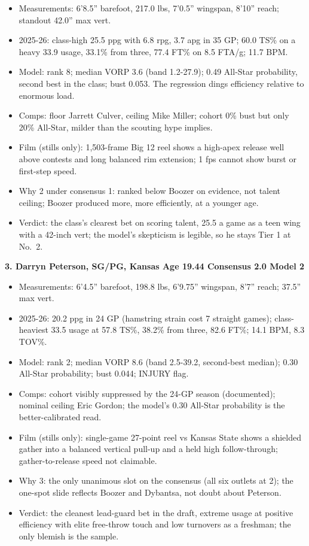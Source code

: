 \documentclass[
  10pt,
]{article}
\providecommand{\tightlist}{%
  \setlength{\itemsep}{0pt}\setlength{\parskip}{0pt}}
\begin{document}
\begin{itemize}
\tightlist
\item
  Measurements: 6'8.5'' barefoot, 217.0 lbs, 7'0.5'' wingspan, 8'10'' reach;
  standout 42.0'' max vert.
\item
  2025-26: class-high 25.5 ppg with 6.8 rpg, 3.7 apg in 35 GP; 60.0 TS\% on a
  heavy 33.9 usage, 33.1\% from three, 77.4 FT\% on 8.5 FTA/g; 11.7 BPM.
\item
  Model: rank 8; median VORP 3.6 (band 1.2-27.9); 0.49 All-Star probability,
  second best in the class; bust 0.053. The regression dings efficiency relative
  to enormous load.
\item
  Comps: floor Jarrett Culver, ceiling Mike Miller; cohort 0\% bust but only
  20\% All-Star, milder than the scouting hype implies.
\item
  Film (stills only): 1,503-frame Big 12 reel shows a high-apex release well
  above contests and long balanced rim extension; 1 fps cannot show burst or
  first-step speed.
\item
  Why 2 under consensus 1: ranked below Boozer on evidence, not talent ceiling;
  Boozer produced more, more efficiently, at a younger age.
\item
  Verdict: the class's clearest bet on scoring talent, 25.5 a game as a teen
  wing with a 42-inch vert; the model's skepticism is legible, so he stays Tier
  1 at No.~2.
\end{itemize}

\textbf{3. Darryn Peterson, SG/PG, Kansas \textbar{} Age 19.44 \textbar{}
Consensus 2.0 \textbar{} Model 2}

\begin{itemize}
\tightlist
\item
  Measurements: 6'4.5'' barefoot, 198.8 lbs, 6'9.75'' wingspan, 8'7'' reach;
  37.5'' max vert.
\item
  2025-26: 20.2 ppg in 24 GP (hamstring strain cost 7 straight games);
  class-heaviest 33.5 usage at 57.8 TS\%, 38.2\% from three, 82.6 FT\%; 14.1
  BPM, 8.3 TOV\%.
\item
  Model: rank 2; median VORP 8.6 (band 2.5-39.2, second-best median); 0.30
  All-Star probability; bust 0.044; INJURY flag.
\item
  Comps: cohort visibly suppressed by the 24-GP season (documented); nominal
  ceiling Eric Gordon; the model's 0.30 All-Star probability is the
  better-calibrated read.
\item
  Film (stills only): single-game 27-point reel vs Kansas State shows a shielded
  gather into a balanced vertical pull-up and a held high follow-through;
  gather-to-release speed not claimable.
\item
  Why 3: the only unanimous slot on the consensus (all six outlets at 2); the
  one-spot slide reflects Boozer and Dybantsa, not doubt about Peterson.
\item
  Verdict: the cleanest lead-guard bet in the draft, extreme usage at positive
  efficiency with elite free-throw touch and low turnovers as a freshman; the
  only blemish is the sample.
\end{itemize}
\end{document}
